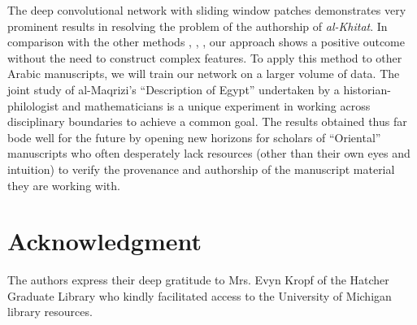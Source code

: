 \documentclass[a4paper,conference]{IEEEtran}
\begin{document}
The deep convolutional network with sliding window patches demonstrates very prominent results in resolving the problem of the authorship of {\it al-Khitat}. In comparison with the other methods \cite{MBulacu}, \cite{MBulacu1}, \cite{DFecker}, \cite{Salvador} our approach shows a positive outcome without the need to construct complex features. To apply this method to other Arabic manuscripts, we will train our network on a larger volume of data. The joint study of al-Maqrizi's ``Description of Egypt'' undertaken by a historian-philologist and mathematicians is a unique experiment in working across disciplinary boundaries to achieve a common goal. The results obtained thus far bode well for the future by opening new horizons for scholars of ``Oriental'' manuscripts who often desperately lack resources (other than their own eyes and intuition) to verify the provenance and authorship of the manuscript material they are working with.

\section*{Acknowledgment}
The authors express their deep gratitude to Mrs. Evyn Kropf of the Hatcher Graduate Library who kindly facilitated access to the University of Michigan library resources.

 

\end{document}
